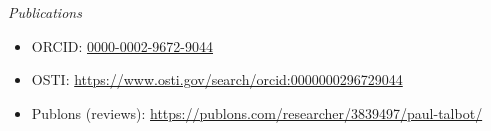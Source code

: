 \documentclass{res}
\begin{document}
\begin{resume}
\vspace{10pt}
{\sl Publications} %
\begin{itemize}
  \item ORCID: \href{https://orcid.org/0000-0002-9672-9044}{0000-0002-9672-9044}
  \item OSTI: \url{https://www.osti.gov/search/orcid:0000000296729044}
  \item Publons (reviews): \url{https://publons.com/researcher/3839497/paul-talbot/}
\end{itemize}

\vspace{0.2in}


\end{resume}
\end{document}
